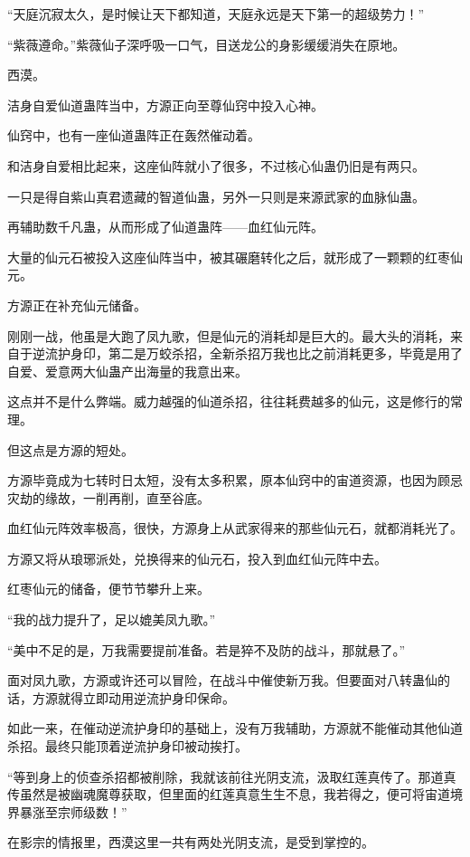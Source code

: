 \begin{this_body}
“天庭沉寂太久，是时候让天下都知道，天庭永远是天下第一的超级势力！”

“紫薇遵命。”紫薇仙子深呼吸一口气，目送龙公的身影缓缓消失在原地。

西漠。

洁身自爱仙道蛊阵当中，方源正向至尊仙窍中投入心神。

仙窍中，也有一座仙道蛊阵正在轰然催动着。

和洁身自爱相比起来，这座仙阵就小了很多，不过核心仙蛊仍旧是有两只。

一只是得自紫山真君遗藏的智道仙蛊，另外一只则是来源武家的血脉仙蛊。

再辅助数千凡蛊，从而形成了仙道蛊阵——血红仙元阵。

大量的仙元石被投入这座仙阵当中，被其碾磨转化之后，就形成了一颗颗的红枣仙元。

方源正在补充仙元储备。

刚刚一战，他虽是大跑了凤九歌，但是仙元的消耗却是巨大的。最大头的消耗，来自于逆流护身印，第二是万蛟杀招，全新杀招万我也比之前消耗更多，毕竟是用了自爱、爱意两大仙蛊产出海量的我意出来。

这点并不是什么弊端。威力越强的仙道杀招，往往耗费越多的仙元，这是修行的常理。

但这点是方源的短处。

方源毕竟成为七转时日太短，没有太多积累，原本仙窍中的宙道资源，也因为顾忌灾劫的缘故，一削再削，直至谷底。

血红仙元阵效率极高，很快，方源身上从武家得来的那些仙元石，就都消耗光了。

方源又将从琅琊派处，兑换得来的仙元石，投入到血红仙元阵中去。

红枣仙元的储备，便节节攀升上来。

“我的战力提升了，足以媲美凤九歌。”

“美中不足的是，万我需要提前准备。若是猝不及防的战斗，那就悬了。”

面对凤九歌，方源或许还可以冒险，在战斗中催使新万我。但要面对八转蛊仙的话，方源就得立即动用逆流护身印保命。

如此一来，在催动逆流护身印的基础上，没有万我辅助，方源就不能催动其他仙道杀招。最终只能顶着逆流护身印被动挨打。

“等到身上的侦查杀招都被削除，我就该前往光阴支流，汲取红莲真传了。那道真传虽然是被幽魂魔尊获取，但里面的红莲真意生生不息，我若得之，便可将宙道境界暴涨至宗师级数！”

在影宗的情报里，西漠这里一共有两处光阴支流，是受到掌控的。


\end{this_body}
